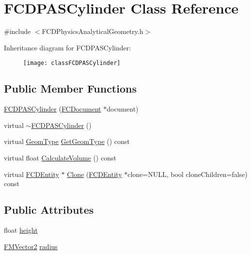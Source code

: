 \hypertarget{classFCDPASCylinder}{
\section{FCDPASCylinder Class Reference}
\label{classFCDPASCylinder}
}


{\ttfamily \#include $<$FCDPhysicsAnalyticalGeometry.h$>$}

Inheritance diagram for FCDPASCylinder:\begin{figure}[H]
\begin{center}
\leavevmode
\texttt{[image: classFCDPASCylinder]}
\end{center}
\end{figure}
\subsection*{Public Member Functions}
\begin{DoxyCompactItemize}
\item 
\hyperlink{classFCDPASCylinder_a678b7cc16e1e2a476aebb2899ab2d178}{FCDPASCylinder} (\hyperlink{classFCDocument}{FCDocument} $\ast$document)
\item 
virtual \hyperlink{classFCDPASCylinder_a8aafdffc070de8170008b24224f0f11c}{$\sim$FCDPASCylinder} ()
\item 
virtual \hyperlink{classFCDPhysicsAnalyticalGeometry_a511583406e5c6a1bb5bd84c0453a452c}{GeomType} \hyperlink{classFCDPASCylinder_a2c13420ee5b1dbb527dbd15043a9cc09}{GetGeomType} () const 
\item 
virtual float \hyperlink{classFCDPASCylinder_a20e4055372f2a805dff71d560246f212}{CalculateVolume} () const 
\item 
virtual \hyperlink{classFCDEntity}{FCDEntity} $\ast$ \hyperlink{classFCDPASCylinder_a9f398013a3fd84fa83c4da99ca4b7c25}{Clone} (\hyperlink{classFCDEntity}{FCDEntity} $\ast$clone=NULL, bool cloneChildren=false) const 
\end{DoxyCompactItemize}
\subsection*{Public Attributes}
\begin{DoxyCompactItemize}
\item 
float \hyperlink{classFCDPASCylinder_a90fa5cdf47b99ca8f80e7f012aefe9bf}{height}
\item 
\hyperlink{classFMVector2}{FMVector2} \hyperlink{classFCDPASCylinder_a88a429bb5938ab2bd95b13baa27b3db8}{radius}
\end{DoxyCompactItemize}


